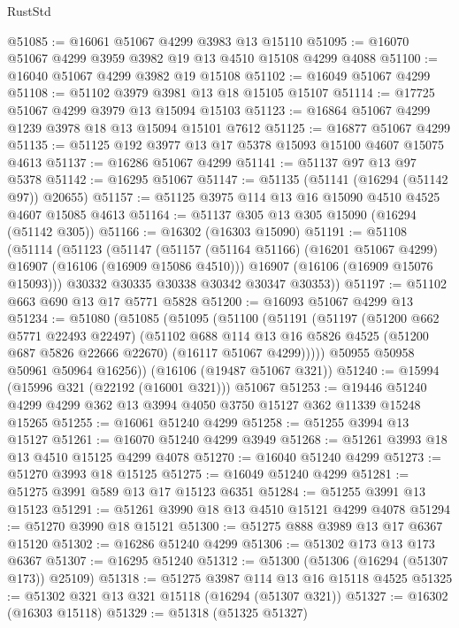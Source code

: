 \begin{lexlean}{RustStd}
\begin{coremodule}
@51085 := @16061 @51067 @4299 @3983 @13 @15110
@51095 := @16070 @51067 @4299 @3959 @3982 @19 @13 @4510 @15108 @4299 @4088
@51100 := @16040 @51067 @4299 @3982 @19 @15108
@51102 := @16049 @51067 @4299
@51108 := @51102 @3979 @3981 @13 @18 @15105 @15107
@51114 := @17725 @51067 @4299 @3979 @13 @15094 @15103
@51123 := @16864 @51067 @4299 @1239 @3978 @18 @13 @15094 @15101 @7612
@51125 := @16877 @51067 @4299
@51135 := @51125 @192 @3977 @13 @17 @5378 @15093 @15100 @4607 @15075 @4613
@51137 := @16286 @51067 @4299
@51141 := @51137 @97 @13 @97 @5378
@51142 := @16295 @51067
@51147 := @51135 (@51141 (@16294 (@51142 @97)) @20655)
@51157 := @51125 @3975 @114 @13 @16 @15090 @4510 @4525 @4607 @15085 @4613
@51164 := @51137 @305 @13 @305 @15090 (@16294 (@51142 @305))
@51166 := @16302 (@16303 @15090)
@51191 := @51108
    (@51114
      (@51123
        (@51147
          (@51157 (@51164 @51166) (@16201 @51067 @4299) @16907 (@16106 (@16909 @15086 @4510)))
          @16907
          (@16106 (@16909 @15076 @15093)))
        @30332
        @30335
        @30338
        @30342
        @30347
        @30353))
@51197 := @51102 @663 @690 @13 @17 @5771 @5828
@51200 := @16093 @51067 @4299 @13
@51234 := @51080
    (@51085
      (@51095
        (@51100
          (@51191
            (@51197
              (@51200 @662 @5771 @22493 @22497)
              (@51102
                @688
                @114
                @13
                @16
                @5826
                @4525
                (@51200 @687 @5826 @22666 @22670)
                (@16117 @51067 @4299)))))
        @50955
        @50958
        @50961
        @50964
        @16256))
    (@16106 (@19487 @51067 @321))
@51240 := @15994 (@15996 @321 (@22192 (@16001 @321))) @51067
@51253 := @19446 @51240 @4299 @4299 @362 @13 @3994 @4050 @3750 @15127 @362 @11339 @15248 @15265
@51255 := @16061 @51240 @4299
@51258 := @51255 @3994 @13 @15127
@51261 := @16070 @51240 @4299 @3949
@51268 := @51261 @3993 @18 @13 @4510 @15125 @4299 @4078
@51270 := @16040 @51240 @4299
@51273 := @51270 @3993 @18 @15125
@51275 := @16049 @51240 @4299
@51281 := @51275 @3991 @589 @13 @17 @15123 @6351
@51284 := @51255 @3991 @13 @15123
@51291 := @51261 @3990 @18 @13 @4510 @15121 @4299 @4078
@51294 := @51270 @3990 @18 @15121
@51300 := @51275 @888 @3989 @13 @17 @6367 @15120
@51302 := @16286 @51240 @4299
@51306 := @51302 @173 @13 @173 @6367
@51307 := @16295 @51240
@51312 := @51300 (@51306 (@16294 (@51307 @173)) @25109)
@51318 := @51275 @3987 @114 @13 @16 @15118 @4525
@51325 := @51302 @321 @13 @321 @15118 (@16294 (@51307 @321))
@51327 := @16302 (@16303 @15118)
@51329 := @51318 (@51325 @51327)

\end{coremodule}
\end{lexlean}
